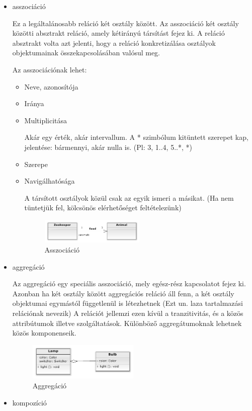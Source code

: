 \documentclass[margin=0px]{article}
\begin{document}
\begin{description}
\begin{itemize}
 						\item asszociáció
	 						
	 						Ez a legáltalánosabb reláció két osztály között. Az asszociáció két osztály
	 						közötti absztrakt reláció, amely kétirányú társítást fejez ki. A
	 						reláció absztrakt volta azt jelenti, hogy a reláció konkretizálása osztályok
	 						objektumainak összekapcsolásában valósul meg.
	 						
	 						Az asszociációnak lehet:
	 						\begin{itemize}
	 							\item Neve, azonosítója
	 							\item Iránya
	 							\item Multiplicitása 
	 							
	 							Akár egy érték, akár intervallum. A * szimbólum kitüntett szerepet kap, jelentése: bármennyi, akár nulla is. (Pl: 3, 1..4, 5..*, *)
	 							\item Szerepe
	 							\item Navigálhatósága 
	 							
	 							A társított osztályok közül csak az egyik ismeri a másikat. (Ha nem tüntetjük fel, kölcsönös elérhetőséget feltételezünk) 
	 							
		 						\begin{figure}[H]
		 							\centering
		 							\includegraphics[width=0.5\textwidth]{img/asszociacio.png}
		 							\caption{Asszociáció}
		 						\end{figure}	
	 						\end{itemize}
	 					\item aggregáció
		 					
		 					Az aggregáció egy speciális asszociáció, mely egész-rész kapcsolatot fejez ki. Azonban ha két osztály között aggregációs reláció áll fenn, a két osztály objektumai egymástól függetlenül is létezhetnek (Ezt un. laza tartalmazási relációnak nevezik) A relációt jellemzi ezen kívül a tranzitivitás, és a közös attribútumok illetve szolgáltatások. Különböző aggregátumoknak lehetnek közös komponenseik.
		 						\begin{figure}[H]
		 							\centering
		 							\includegraphics[width=0.5\textwidth]{img/aggregacio.png}
		 							\caption{Aggregáció}
		 						\end{figure}
 						\item kompozíció
 						

\end{itemize}
\end{description}
\end{document}
